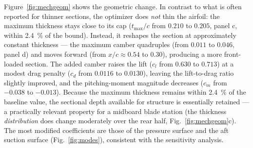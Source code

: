 \documentclass[preprint,3p,times]{elsarticle}
\begin{document}
Figure~\ref{fig:mechgeom} shows the geometric change. In contrast to what is
often reported for thinner sections, the optimizer does \emph{not} thin the
airfoil: the maximum thickness stays close to its cap ($t_{\max}/c$ from
$0.210$ to $0.205$, panel c, within \SI{2.4}{\percent} of the bound).
Instead, it reshapes the section at approximately constant thickness --- the maximum
camber quadruples (from $0.011$ to $0.046$, panel d) and moves forward (from
$x/c\approx0.54$ to $0.30$), producing a more front-loaded section. The added
camber raises the lift ($c_l$ from $0.630$ to $0.713$) at a modest drag penalty
($c_d$ from $0.0116$ to $0.0130$), leaving the lift-to-drag ratio slightly
improved, and the pitching-moment magnitude decreases ($c_m$ from $-0.038$ to
$-0.013$). Because the maximum thickness remains within \SI{2.4}{\percent} of
the baseline value, the sectional depth available for structure is
essentially retained --- a practically relevant property for a midboard
blade station (the thickness \emph{distribution} does change moderately over
the rear half, Fig.~\ref{fig:mechgeom}c). The most modified coefficients are those of the pressure surface
and the aft suction surface (Fig.~\ref{fig:modes}), consistent with the
sensitivity analysis.
\end{document}
